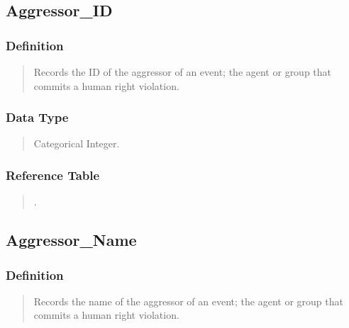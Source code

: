 \documentclass[letterpaper,10pt,english]{sphinxmanual}
\begin{document}
\subsection{Aggressor\_ID}
\label{\detokenize{database_schema:aggressor-id}}

\subsubsection{Definition}
\label{\detokenize{database_schema:id2}}\begin{quote}

\sphinxAtStartPar
Records the ID of the aggressor of an event; the agent or group that commits a human right violation.
\end{quote}


\subsubsection{Data Type}
\label{\detokenize{database_schema:id3}}\begin{quote}

\sphinxAtStartPar
Categorical Integer.
\end{quote}


\subsubsection{Reference Table}
\label{\detokenize{database_schema:id4}}\begin{quote}

\sphinxAtStartPar
{\hyperref[\detokenize{database_schema:aggressor-table}]{}} .
\end{quote}


\subsection{Aggressor\_Name}
\label{\detokenize{database_schema:aggressor-name}}

\subsubsection{Definition}
\label{\detokenize{database_schema:id5}}\begin{quote}

\sphinxAtStartPar
Records the name of the aggressor of an event; the agent or group that commits a human right violation.
\end{quote}
\end{document}
